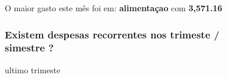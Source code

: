 \documentclass[
  8pt,
  a4paper,
  DIV=11,
  numbers=noendperiod]{scrartcl}
\begin{document}
\begin{figure}
\begin{minipage}{0.50\linewidth}
O maior gasto este mês foi em: \textbf{alimentaçao} com
\textbf{3,571.16}

\end{minipage}%

\end{figure}%

\begin{figure}

\begin{minipage}{0.50\linewidth}

\subsubsection{Existem despesas recorrentes nos trimeste / simestre
?}\label{existem-despesas-recorrentes-nos-trimeste-simestre}

ultimo trimeste\end{minipage}%
%
\begin{minipage}{0.50\linewidth}

\end{minipage}%
\newline
\begin{minipage}{0.50\linewidth}


\end{minipage}
\end{figure}
\end{document}
